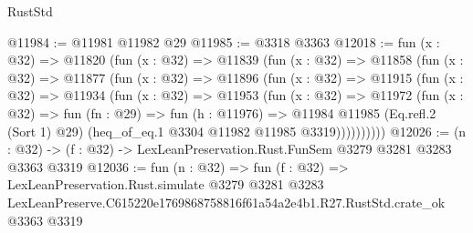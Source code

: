 \begin{lexlean}{RustStd}
\begin{coremodule}
@11984 := @11981 @11982 @29
@11985 := @3318 @3363
@12018 := fun (x : @32) =>
  @11820
    (fun (x : @32) =>
    @11839
      (fun (x : @32) =>
      @11858
        (fun (x : @32) =>
        @11877
          (fun (x : @32) =>
          @11896
            (fun (x : @32) =>
            @11915
              (fun (x : @32) =>
              @11934
                (fun (x : @32) =>
                @11953
                  (fun (x : @32) =>
                  @11972
                    (fun (x : @32) =>
                    fun (fn : @29) =>
                    fun (h : @11976) =>
                    @11984
                      @11985
                      (Eq.refl.{2} (Sort 1) @29)
                      (heq_of_eq.{1} @3304 @11982 @11985 @3319))))))))))
@12026 := (n : @32) -> (f : @32) -> LexLeanPreservation.Rust.FunSem @3279 @3281 @3283 @3363 @3319
@12036 := fun (n : @32) =>
  fun (f : @32) =>
  LexLeanPreservation.Rust.simulate
    @3279
    @3281
    @3283
    LexLeanPreserve.C615220e1769868758816f61a54a2e4b1.R27.RustStd.crate_ok
    @3363
    @3319
\end{coremodule}
\end{lexlean}

